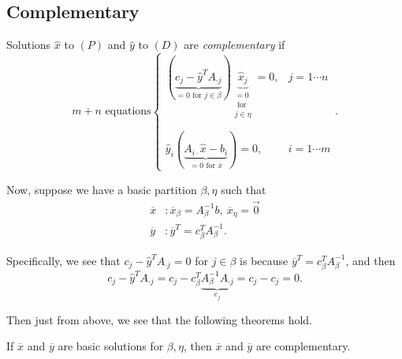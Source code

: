 \subsection{Complementary}
Solutions \(\hat{x}\) to \((P)\) and \(\hat{y}\) to \((D)\) are \emph{complementary} if
\[
	m+n\text{ equations}\begin{cases}
		(\underbrace{c_{j} - \hat{y}^{T} A_{\cdot j}}_{ = 0\text{ for }j\in \beta}) \underbrace{\hat{x}_j}_{ \substack{= 0 \\\text{ for }\\j\in \eta}} = 0, & j = 1\cdots n \\\\
		\hat{y}_i(\underbrace{A_{i\cdot} \hat{x} - b_{i}}_{ = 0 \text{ for }\overline{x}}) = 0, & i = 1\cdots m
	\end{cases}.
\]

Now, suppose we have a basic partition \(\beta, \eta\) such that
\[
	\begin{split}
		\overline{x}&: \overline{x}_{\beta} = A^{-1}_{\beta}b,\ \overline{x}_{\eta} = \vec{0}\\
		\overline{y}&: \overline{y}^{T} = c^{T}_{\beta}A^{-1}_{\beta}.
	\end{split}
\]

\begin{note}
	Specifically, we see that \(c_{j} - \hat{y}^{T}A_{\cdot j} = 0\) for \(j\in\beta\) is because \(\overline{y}^{T} = c^{T}_{\beta}A^{-1}_{\beta}\), and then
	\[
		c_{j} - \hat{y}^{T}A_{\cdot j} = c_{j} - c^{T}_{\beta}\underbrace{A^{-1}_{\beta}A_{\cdot j}}_{e_{j}} = c_{j} - c_{j} = 0.
	\]
\end{note}

Then just from above, we see that the following theorems hold.
\begin{theorem}
	If \(\overline{x}\) and \(\overline{y}\) are basic solutions for \(\beta, \eta\), then \(\overline{x}\) and \(\overline{y}\) are
	complementary.
\end{theorem}


